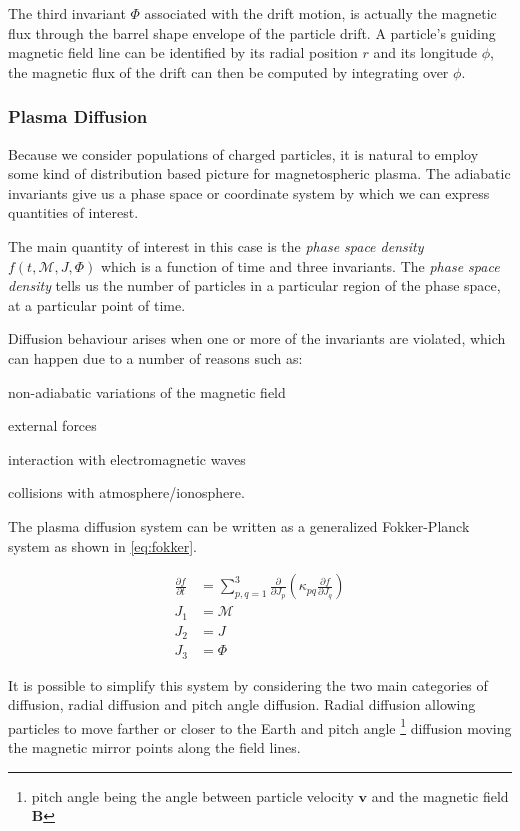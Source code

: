The third invariant $\Phi$ associated with the drift motion, is actually the magnetic flux through the barrel 
shape envelope of the particle drift. A particle's guiding magnetic field line can be identified by its radial 
position $r$ and its longitude $\phi$, the magnetic flux of the drift can then be computed by integrating over 
$\phi$.

\subsubsection*{Plasma Diffusion}

Because we consider populations of charged particles, it is natural to employ some kind of distribution based 
picture for magnetospheric plasma. The adiabatic invariants give us a phase space or coordinate system by which 
we can express quantities of interest. 

The main quantity of interest in this case is the \emph{phase space density} $f(t, \mathcal{M}, J, \Phi)$ which 
is a function of time and three invariants. The \emph{phase space density} tells us the number of particles in 
a particular region of the phase space, at a particular point of time.

Diffusion behaviour arises when one or more of the invariants are violated, which can happen due to a number of 
reasons such as: 
\begin{enumerate*}
    \item non-adiabatic variations of the magnetic field 
    \item external forces
    \item interaction with electromagnetic waves
    \item collisions with atmosphere/ionosphere. 
\end{enumerate*}

The plasma diffusion system \citep{schulz2012particle} can be written as a generalized Fokker-Planck system as shown 
in \cref{eq:fokker}.

\begin{align}\label{eq:fokker}
    \frac{\partial{f}}{\partial{t}} &= \sum^{3}_{p,q = 1}
    \frac{\partial}{\partial{J_{p}}} \left( \kappa_{pq}
    \frac{\partial{f}}{\partial{J_{q}}} \right) \\
    J_1 &= \mathcal{M} \\
    J_2 &= J \\
    J_{3} &= \Phi
\end{align}

It is possible to simplify this system by considering the two main categories of diffusion, radial diffusion and 
pitch angle diffusion. Radial diffusion allowing particles to move farther or closer to the Earth and pitch angle 
\footnote{pitch angle being the angle between particle velocity $\mathbf{v}$ and the magnetic field $\mathbf{B}$} 
diffusion moving the magnetic mirror points along the field lines.

